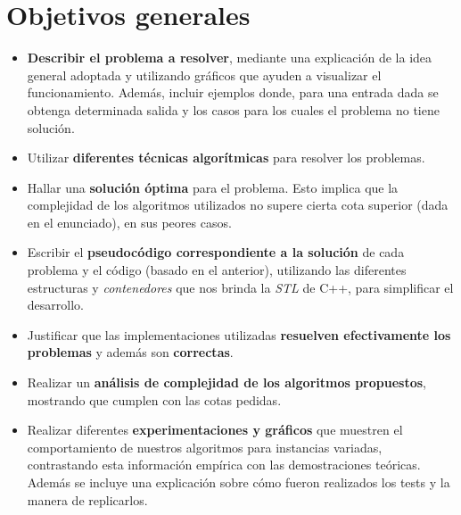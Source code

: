 \documentclass[a4paper]{article}
\begin{document}
\section{Objetivos generales}
\begin{itemize}
  \item \textbf{Describir el problema a resolver}, mediante una explicación de la idea general adoptada y
  utilizando gráficos que ayuden a visualizar el funcionamiento. Además, incluir ejemplos donde,
  para una entrada dada se obtenga determinada salida y los casos para los cuales el problema no
  tiene solución.

  \item Utilizar \textbf{diferentes técnicas algorítmicas} para resolver los problemas.

  \item Hallar una \textbf{solución óptima} para el problema. Esto implica que la complejidad de los
  algoritmos utilizados no supere cierta cota superior (dada en el enunciado), en sus peores casos.

  \item Escribir el \textbf{pseudocódigo correspondiente a la solución} de cada problema y el código
  (basado en el anterior), utilizando las diferentes estructuras y \textit{contenedores} que nos
  brinda la \textit{STL} de C++, para simplificar el desarrollo.

  \item Justificar que las implementaciones utilizadas \textbf{resuelven efectivamente los problemas} y
  además son \textbf{correctas}.

  \item Realizar un \textbf{análisis de complejidad de los algoritmos propuestos}, mostrando que cumplen
  con las cotas pedidas.

  \item Realizar diferentes \textbf{experimentaciones y gráficos} que muestren el comportamiento de nuestros
  algoritmos para instancias variadas, contrastando esta información empírica con las demostraciones
  teóricas. Además se incluye una explicación sobre cómo fueron realizados los tests y la manera de replicarlos.
\end{itemize}


\newpage
\end{document}
